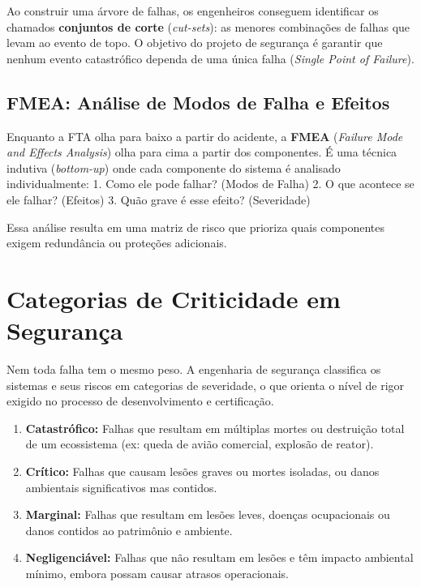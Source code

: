 \documentclass[12pt,a4paper]{report}
\begin{document}
Ao construir uma árvore de falhas, os engenheiros conseguem identificar os chamados \textbf{conjuntos de corte} (\emph{cut-sets}): as menores combinações de falhas que levam ao evento de topo. O objetivo do projeto de segurança é garantir que nenhum evento catastrófico dependa de uma única falha (\emph{Single Point of Failure}).

\subsection{FMEA: Análise de Modos de Falha e Efeitos}

Enquanto a FTA olha para baixo a partir do acidente, a \textbf{FMEA} (\emph{Failure Mode and Effects Analysis}) olha para cima a partir dos componentes. É uma técnica indutiva (\emph{bottom-up}) onde cada componente do sistema é analisado individualmente:
1.  Como ele pode falhar? (Modos de Falha)
2.  O que acontece se ele falhar? (Efeitos)
3.  Quão grave é esse efeito? (Severidade)

Essa análise resulta em uma matriz de risco que prioriza quais componentes exigem redundância ou proteções adicionais.

\section{Categorias de Criticidade em Segurança}

Nem toda falha tem o mesmo peso. A engenharia de segurança classifica os sistemas e seus riscos em categorias de severidade, o que orienta o nível de rigor exigido no processo de desenvolvimento e certificação.

\begin{enumerate}
    \item \textbf{Catastrófico:} Falhas que resultam em múltiplas mortes ou destruição total de um ecossistema (ex: queda de avião comercial, explosão de reator).
    \item \textbf{Crítico:} Falhas que causam lesões graves ou mortes isoladas, ou danos ambientais significativos mas contidos.
    \item \textbf{Marginal:} Falhas que resultam em lesões leves, doenças ocupacionais ou danos contidos ao patrimônio e ambiente.
    \item \textbf{Negligenciável:} Falhas que não resultam em lesões e têm impacto ambiental mínimo, embora possam causar atrasos operacionais.
\end{enumerate}
\end{document}
